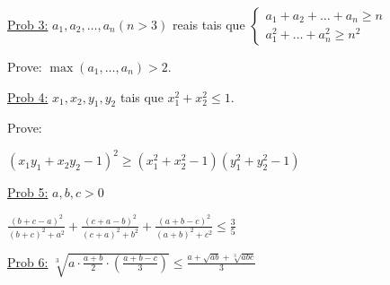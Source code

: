 \documentclass[a4paper,12pt]{article}
\renewcommand{\leq}{\ensuremath{\leqslant}}
\theoremstyle{plain} %
\theoremstyle{definition} %
\theoremstyle{remark} %
\begin{document}
	\vspace{2ex}\underline{Prob 3:} $a_1, a_2, \dotso, a_n (n>3)$ reais tais que $\left\{\begin{array}{l}a_{1}+a_{2}+\ldots+a_{n} \geqslant n \\ a_{1}^{2}+\ldots+a_{n}^{2} \geqslant n^{2}\end{array}\right.$
	
	\begin{framed}
		Prove: $\max (a_1, \dotso, a_n)>2$.
	\end{framed}
	
	\vspace{2ex}\underline{Prob 4:} $x_1, x_2, y_1, y_2$ tais que $x_1^2+x_2^2\leq 1$. 
	
	\begin{framed}
		Prove:
		
		\begin{center}
			$\left(x_{1} y_{1}+x_{2} y_{2}-1\right)^{2} \geqslant\left(x_{1}^{2}+x_{2}^{2}-1\right)\left(y_{1}^{2}+y_{2}^{2}-1\right)$
		\end{center}
		
	\end{framed}
	
	\vspace{2ex}\underline{Prob 5:} $a, b, c>0$
	
	\begin{center}
		$\displaystyle\frac{(b+c-a)^{2}}{(b+c)^{2}+a^{2}}+\frac{(c+a-b)^{2}}{(c+a)^{2}+b^{2}}+\frac{(a+b-c)^{2}}{(a+b)^{2}+c^{2}} \leq \frac{3}{5}$
	\end{center}
	
	\vspace{2ex}\underline{Prob 6:} $\displaystyle\sqrt[3]{a \cdot \frac{a+b}{2} \cdot\left(\frac{a+b-c}{3}\right)} \leq \frac{a+\sqrt{a b}+\sqrt[3]{a b c}}{3}$
	
\end{document}
